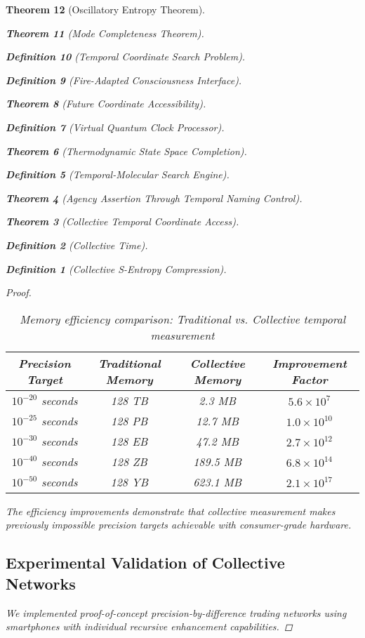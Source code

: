 \documentclass[12pt,a4paper]{article}
\newtheorem{theorem}{Theorem}[section]
\newtheorem{definition}[theorem]{Definition}
\begin{document}
\begin{theorem}[Oscillatory Entropy Theorem]
\begin{theorem}[Mode Completeness Theorem]
\begin{enumerate}
\begin{definition}[Temporal Coordinate Search Problem]
\begin{algorithm}
\begin{definition}[Fire-Adapted Consciousness Interface]
\begin{theorem}[Future Coordinate Accessibility]
\begin{definition}[Virtual Quantum Clock Processor]
\begin{itemize}
\begin{itemize}
\begin{theorem}[Thermodynamic State Space Completion]
\begin{definition}[Temporal-Molecular Search Engine]
\begin{theorem}[Agency Assertion Through Temporal Naming Control]
\begin{remark}
\begin{theorem}[Collective Temporal Coordinate Access]
\begin{definition}[Collective Time]
\begin{definition}[Collective S-Entropy Compression]
\begin{proof}
\begin{table}[h]
\centering
\begin{tabular}{|c|c|c|c|}
\hline
\textbf{Precision Target} & \textbf{Traditional Memory} & \textbf{Collective Memory} & \textbf{Improvement Factor} \\
\hline
$10^{-20}$ seconds & 128 TB & 2.3 MB & $5.6 \times 10^7$ \\
$10^{-25}$ seconds & 128 PB & 12.7 MB & $1.0 \times 10^{10}$ \\
$10^{-30}$ seconds & 128 EB & 47.2 MB & $2.7 \times 10^{12}$ \\
$10^{-40}$ seconds & 128 ZB & 189.5 MB & $6.8 \times 10^{14}$ \\
$10^{-50}$ seconds & 128 YB & 623.1 MB & $2.1 \times 10^{17}$ \\
\hline
\end{tabular}
\caption{Memory efficiency comparison: Traditional vs. Collective temporal measurement}
\end{table}

The efficiency improvements demonstrate that collective measurement makes previously impossible precision targets achievable with consumer-grade hardware.

\subsection{Experimental Validation of Collective Networks}

We implemented proof-of-concept precision-by-difference trading networks using smartphones with individual recursive enhancement capabilities.


\end{proof}
\end{definition}
\end{definition}
\end{theorem}
\end{remark}
\end{theorem}
\end{definition}
\end{theorem}
\end{itemize}
\end{itemize}
\end{definition}
\end{theorem}
\end{definition}
\end{algorithm}
\end{definition}
\end{enumerate}
\end{theorem}
\end{theorem}
\end{document}
